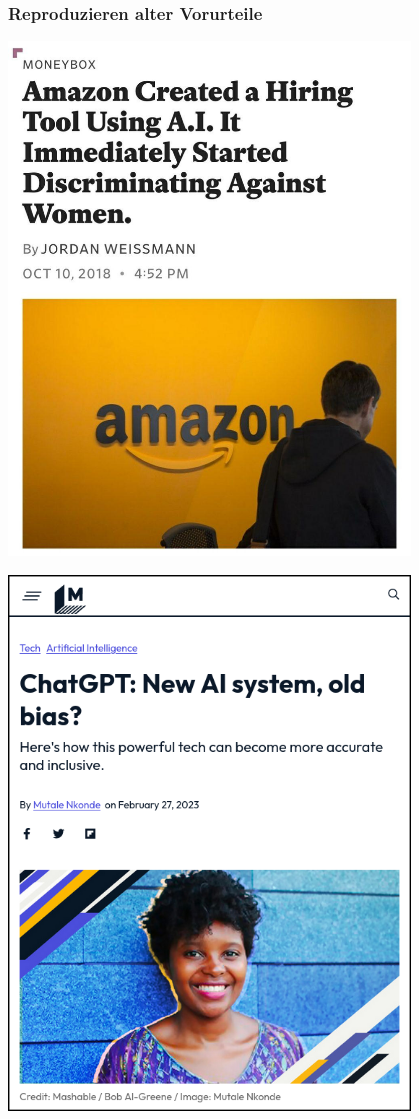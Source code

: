 \documentclass[aspectratio=169,usenames,dvipsnames]{beamer}
\begin{document}
\begin{frame}
\frametitle{Reproduzieren alter Vorurteile}
\begin{minipage}{0.45\textwidth}
\begin{center}
\includegraphics[width=0.8\textwidth, keepaspectratio]{images/amazon_hiring}
\end{center}
\pause
\end{minipage}\hfill\begin{minipage}{0.45\textwidth}
\begin{center}
\includegraphics[width=0.8\textwidth, keepaspectratio]{images/mashable}
\end{center}
\end{minipage}
\end{frame}
\end{document}
